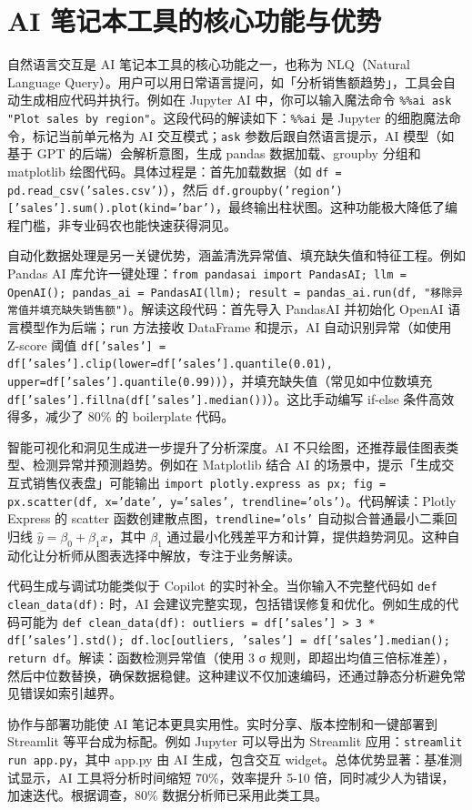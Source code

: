 \chapter{AI 笔记本工具的核心功能与优势}
自然语言交互是 AI 笔记本工具的核心功能之一，也称为 NLQ（Natural Language Query）。用户可以用日常语言提问，如「分析销售额趋势」，工具会自动生成相应代码并执行。例如在 Jupyter AI 中，你可以输入魔法命令 \texttt{\%{}\%{}ai ask "Plot sales by region"}。这段代码的解读如下：\texttt{\%{}\%{}ai} 是 Jupyter 的细胞魔法命令，标记当前单元格为 AI 交互模式；\texttt{ask} 参数后跟自然语言提示，AI 模型（如基于 GPT 的后端）会解析意图，生成 pandas 数据加载、groupby 分组和 matplotlib 绘图代码。具体过程是：首先加载数据（如 \texttt{df = pd.read\_{}csv('sales.csv')}），然后 \texttt{df.groupby('region')['sales'].sum().plot(kind='bar')}，最终输出柱状图。这种功能极大降低了编程门槛，非专业码农也能快速获得洞见。\par
自动化数据处理是另一关键优势，涵盖清洗异常值、填充缺失值和特征工程。例如 Pandas AI 库允许一键处理：\texttt{from pandasai import PandasAI; llm = OpenAI(); pandas\_{}ai = PandasAI(llm); result = pandas\_{}ai.run(df, "移除异常值并填充缺失销售额")}。解读这段代码：首先导入 PandasAI 并初始化 OpenAI 语言模型作为后端；\texttt{run} 方法接收 DataFrame 和提示，AI 自动识别异常（如使用 Z-score 阈值 \texttt{df['sales'] = df['sales'].clip(lower=df['sales'].quantile(0.01), upper=df['sales'].quantile(0.99))}），并填充缺失值（常见如中位数填充 \texttt{df['sales'].fillna(df['sales'].median())}）。这比手动编写 if-else 条件高效得多，减少了 80\%{} 的 boilerplate 代码。\par
智能可视化和洞见生成进一步提升了分析深度。AI 不只绘图，还推荐最佳图表类型、检测异常并预测趋势。例如在 Matplotlib 结合 AI 的场景中，提示「生成交互式销售仪表盘」可能输出 \texttt{import plotly.express as px; fig = px.scatter(df, x='date', y='sales', trendline='ols')}。代码解读：Plotly Express 的 scatter 函数创建散点图，\texttt{trendline='ols'} 自动拟合普通最小二乘回归线 $\hat{y} = \beta_0 + \beta_1 x$，其中 $\beta_1$ 通过最小化残差平方和计算，提供趋势洞见。这种自动化让分析师从图表选择中解放，专注于业务解读。\par
代码生成与调试功能类似于 Copilot 的实时补全。当你输入不完整代码如 \texttt{def clean\_{}data(df):} 时，AI 会建议完整实现，包括错误修复和优化。例如生成的代码可能为 \texttt{def clean\_{}data(df): outliers = df['sales'] > 3 * df['sales'].std(); df.loc[outliers, 'sales'] = df['sales'].median(); return df}。解读：函数检测异常值（使用 3 σ 规则，即超出均值三倍标准差），然后中位数替换，确保数据稳健。这种建议不仅加速编码，还通过静态分析避免常见错误如索引越界。\par
协作与部署功能使 AI 笔记本更具实用性。实时分享、版本控制和一键部署到 Streamlit 等平台成为标配。例如 Jupyter 可以导出为 Streamlit 应用：\texttt{streamlit run app.py}，其中 app.py 由 AI 生成，包含交互 widget。总体优势显著：基准测试显示，AI 工具将分析时间缩短 70\%{}，效率提升 5-10 倍，同时减少人为错误，加速迭代。根据调查，80\%{} 数据分析师已采用此类工具。\par

